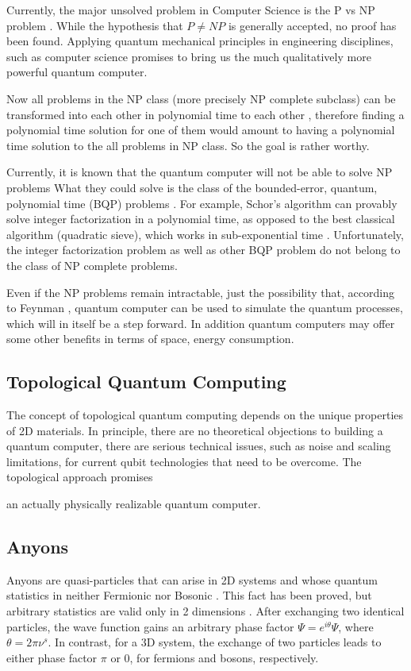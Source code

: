 Currently, the major unsolved problem in Computer Science is the P vs NP problem \cite{PvsNP}. While the hypothesis that $ P \neq NP $ is generally accepted, no proof has been found. Applying quantum mechanical principles in engineering disciplines, such as computer science \cite{FQC} promises to bring us the much qualitatively more powerful quantum computer. 

 Now all problems in the NP class (more precisely NP complete subclass) can be transformed into each other in polynomial time to each other \cite{NPComplete},  therefore finding a polynomial time solution for one of them would amount to having a polynomial time solution to the all problems in NP class. So the goal is rather worthy. 

Currently, it is known that the quantum computer will not be able to solve NP problems  What they could solve is the class of the bounded-error, quantum, polynomial time (BQP) problems \cite{BQP}. 
For example,  Schor's algorithm \cite{Schor} can provably solve integer factorization in a polynomial time, as opposed to the best classical algorithm (quadratic sieve), which works in sub-exponential time \cite{Pomerance}. Unfortunately, the integer factorization problem as well as other BQP problem do not belong to the class of NP complete problems. 

Even if the NP problems remain intractable, just the possibility that, according to Feynman \cite{FQC}, quantum computer can be used to simulate the quantum processes, which will in itself be a step forward. In addition quantum computers may offer some other benefits in terms of space, energy consumption. 

\subsection*{Topological Quantum Computing}
The concept of topological quantum computing \cite{Tqc1}
depends on the unique properties of 2D materials.  In principle, there are no theoretical objections to building a quantum computer, there are serious technical issues, such as noise
and scaling limitations, for current qubit technologies
that need to be overcome\cite{QCProblems}. 
The topological approach promises 

an actually physically realizable quantum computer\cite{Tqc2,Tqc3}. 


\subsection*{Anyons}
Anyons are quasi-particles that can arise in 2D systems and whose quantum statistics in neither Fermionic nor Bosonic \cite{Anyons1}.  This fact has been proved\cite{Anyons2}, but
arbitrary statistics are valid only in 2 dimensions \cite{Walsh}. After exchanging two identical particles, the wave function gains an arbitrary phase factor $ \Psi = e^{i\theta}\Psi $, where $ \theta = 2\pi\nu^{s} $. In contrast, for a 3D system, the exchange of two particles leads to either phase factor $ \pi $ or $ 0 $, for fermions and bosons, respectively.

